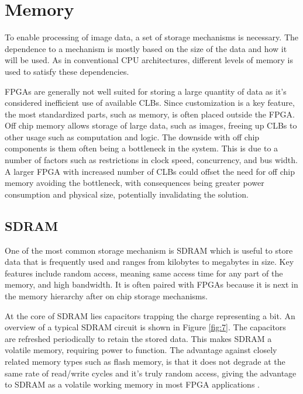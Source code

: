 \documentclass[12pt]{report}
\begin{document}
\section{Memory}
To enable processing of image data, a set of storage mechanisms is necessary. The dependence to a mechanism is mostly based on the size of the data and how it will be used. As in conventional CPU architectures, different levels of memory is used to satisfy these dependencies.
\par
FPGAs are generally not well suited for storing a large quantity of data as it's considered inefficient use of available CLBs. Since customization is a key feature, the most standardized parts, such as memory, is often placed outside the FPGA. Off chip memory allows storage of large data, such as images, freeing up CLBs to other usage such as computation and logic. The downside with off chip components is them often being a bottleneck in the system. This is due to a number of factors such as restrictions in clock speed, concurrency, and bus width. A larger FPGA with increased number of CLBs could offset the need for off chip memory avoiding the bottleneck, with consequences being greater power consumption and physical size, potentially invalidating the solution.

\subsection{SDRAM}
One of the most common storage mechanism is SDRAM which is useful to store data that is frequently used and ranges from kilobytes to megabytes in size. Key features include random access, meaning same access time for any part of the memory, and high bandwidth. It is often paired with FPGAs because it is next in the memory hierarchy after on chip storage mechanisms.
\par
At the core of SDRAM lies capacitors trapping the charge representing a bit. An overview of a typical SDRAM circuit is shown in Figure \ref{fig:7}. The capacitors are refreshed periodically to retain the stored data. This makes SDRAM a volatile memory, requiring power to function. The advantage against closely related memory types such as flash memory, is that it does not degrade at the same rate of read/write cycles and it's truly random access, giving the advantage to SDRAM as a volatile working memory in most FPGA applications \citep{SDRAMFLASH} \citep{NANDNORFlash}.
\end{document}
